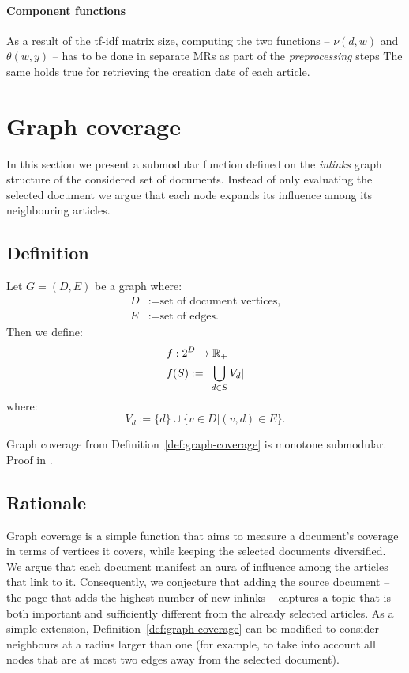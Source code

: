 \paragraph{Component functions}
As a result of the tf-idf matrix size, computing the two functions -- \(\nu(d,
w)\) and \(\theta(w, y)\) -- has to be done in separate \aclp{MR} as part of
the \emph{preprocessing} steps The same holds true for retrieving the creation
date of each article.

\section{Graph coverage}
\label{sec:graph-coverage}

In this section we present a submodular function defined on the \emph{inlinks}
graph structure of the considered set of documents. Instead of only evaluating
the selected document we argue that each node expands its influence among its
neighbouring articles.

\subsection{Definition}

\begin{definition}
  \label{def:graph-coverage}
  Let \(G = (D, E)\) be a graph where:
  \begin{align*}
    D &:= \text{set of document vertices,} \\
    E &:= \text{set of edges.}
  \end{align*}
  Then we define:
  \begin{align*}
    &f : 2^D \to \mathbb{R}_+ \\
    &f(S) := |\bigcup_{d \in S} V_d|
  \end{align*}
  where:
    \[V_d := \{d\} \cup \{v \in D | (v, d) \in E\} \text{.}\]
\end{definition}

\begin{proposition}
  \label{prop:graph-coverage}
  Graph coverage from Definition~\ref{def:graph-coverage} is monotone
  submodular. Proof in .
\end{proposition}

\subsection{Rationale}

Graph coverage is a simple function that aims to measure a document's coverage
in terms of vertices it covers, while keeping the selected documents
diversified.
We argue that each document manifest an aura of influence among the articles
that link to it.
Consequently, we conjecture that adding the source document -- the page
that adds the highest number of new inlinks -- captures a topic that is both
important and sufficiently different from the already selected articles.
As a simple extension, Definition~\vref{def:graph-coverage} can be modified to
consider neighbours at a radius larger than one (for example, to take into
account all nodes that are at most two edges away from the selected document).

